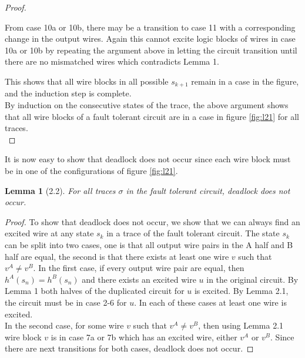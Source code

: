 \documentclass[12pt]{report}
\newtheorem*{lemma}{Lemma}
\begin{document}
\begin{proof}
\begin{itemize}
From case 10a or 10b, there may be a transition to case 11 with a corresponding change in the output wires.  Again this cannot excite logic blocks of wires in case 10a or 10b by repeating the argument above in letting the circuit transition until there are no mismatched wires which contradicts Lemma 1.

\end{itemize}
This shows that all wire blocks in all possible $s_{k+1}$ remain in a case in the figure, and the induction step is complete.\\
By induction on the consecutive states of the trace, the above argument shows that all wire blocks of a fault tolerant circuit are in a case in figure \ref{fig:l21} for all traces. \\
\end{proof}
It is now easy to show that deadlock does not occur since each wire block must be in one of the configurations of figure \ref{fig:l21}.
\begin{lemma}[2.2]
For all traces $\sigma$ in the fault tolerant circuit, deadlock does not occur.
\end{lemma}
\begin{proof}
To show that deadlock does not occur, we show that we can always find an excited wire at any state $s_k$ in a trace of the fault tolerant circuit.  The state $s_k$ can be split into two cases, one is that all output wire pairs in the A half and B half are equal, the second is that there exists at least one wire $v$ such that $v^A\neq v^B$.  In the first case, if every output wire pair are equal, then $h^A(s_n)=h^B(s_n)$ and there exists an excited wire $u$ in the original circuit.  By Lemma 1 both halves of the duplicated circuit for $u$ is excited.  By Lemma 2.1, the circuit must be in case 2-6 for $u$.  In each of these cases at least one wire is excited.  \\
In the second case, for some wire $v$ such that $v^A\neq v^B$, then using Lemma 2.1 wire block $v$ is in case 7a or 7b which has an excited wire, either $v^A$ or $v^B$.  Since there are next transitions for both cases, deadlock does not occur.
\end{proof}
\end{document}
